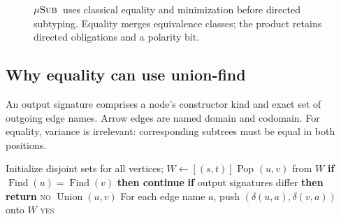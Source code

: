 \documentclass[11pt,letterpaper]{article}
\theoremstyle{definition}\newtheorem{definition}[theorem]{Definition}
\newcommand{\musub}{\ensuremath{\mu\textsc{Sub}}}
\newcommand{\Oh}{\mathcal O}
\begin{document}
\begin{figure}[H]
\centering
{}
\caption{\musub\ uses classical equality and minimization before directed subtyping. Equality merges equivalence classes; the product retains directed obligations and a polarity bit.}
\label{fig:framework}
\end{figure}

\subsection{Why equality can use union-find}
An output signature comprises a node's constructor kind and exact set of outgoing edge names. Arrow edges are named domain and codomain. For equality, variance is irrelevant: corresponding subtrees must be equal in both positions.

\begin{algorithm}[H]
\caption{Unfolding equality (Hopcroft--Karp closure)}\label{alg:eq}
\begin{algorithmic}[1]
\State Initialize disjoint sets for all vertices; $W\gets[(s,t)]$
 \State Pop $(u,v)$ from $W$
 \State \textbf{if} $\operatorname{Find}(u)=\operatorname{Find}(v)$ \textbf{then continue}
 \State \textbf{if} output signatures differ \textbf{then return} \textsc{no}
 \State $\operatorname{Union}(u,v)$
 \State For each edge name $a$, push $(\delta(u,a),\delta(v,a))$ onto $W$
\EndWhile
\State \Return \textsc{yes}
\end{algorithmic}
\end{algorithm}
\end{document}
